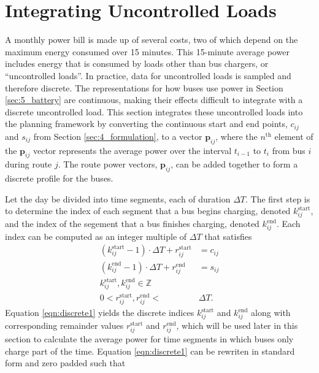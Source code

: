 \section{Integrating Uncontrolled Loads\label{sec:uncontrolled}}
A monthly power bill is made up of several costs, two of which depend on the maximum energy consumed over 15 minutes. This 15-minute average power includes energy that is consumed by loads other than bus chargers, or ``uncontrolled loads''. In practice, data for uncontrolled loads is sampled and therefore discrete. The representations for how buses use power in Section \ref{sec:5_battery} are continuous, making their effects difficult to integrate with a discrete uncontrolled load. This section integrates these uncontrolled loads into the planning framework by converting the continuous start and end points, $c_{ij}$ and $s_{ij}$ from Section \ref{sec:4_formulation}, to a vector $\mathbf{p}_{ij}$, where the $n^{\text{th}}$ element of the $\mathbf{p}_{ij}$ vector represents the average power over the interval $t_{i-1}$ to $t_i$ from bus $i$ during route $j$. The route power vectors, $\mathbf{p}_{ij}$, can be added together to form a discrete profile for the buses.
\par Let the day be divided into time segments, each of duration $\Delta T$. The first step is to determine the index of each segment that a bus begins charging, denoted $k_{ij}^{\text{start}}$, and the index of the segement that a bus finishes charging, denoted $k_{ij}^{\text{end}}$.  Each index can be computed as an integer multiple of $\Delta T$ that satisfies 
\begin{equation} \label{eqn:discrete1} \begin{aligned}
	\left ( k^{\text{start}}_{ij} - 1 \right ) \cdot\Delta T + r^{\text{start}}_{ij}&= c_{ij} \\
	\left (	k^{\text{end}}_{ij} - 1 \right ) \cdot\Delta T + r^{\text{end}}_{ij}&= s_{ij} \\
	k^{\text{start}}_{ij}, k^{\text{end}}_{ij} \in \mathbb{Z} \\
	0 < r^{\text{start}}_{ij}, r^{\text{end}}_{ij} < &\Delta T.
\end{aligned} \end{equation} 
Equation \eqref{eqn:discrete1} yields the discrete indices $k_{ij}^{\text{start}}$ and $k_{ij}^{\text{end}}$ along with corresponding remainder values $r_{ij}^{\text{start}}$ and $r_{ij}^{\text{end}}$, which will be used later in this section to calculate the average power for time segments in which buses only charge part of the time.  Equation \eqref{eqn:discrete1} can be rewriten in standard form and zero padded such that
